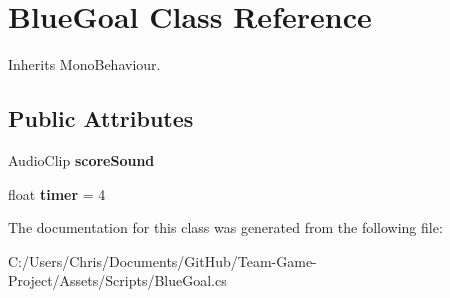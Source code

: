 \hypertarget{class_blue_goal}{}\section{Blue\+Goal Class Reference}
\label{class_blue_goal}


Inherits Mono\+Behaviour.

\subsection*{Public Attributes}
\begin{DoxyCompactItemize}
\item 
Audio\+Clip {\bfseries score\+Sound}\hypertarget{class_blue_goal_ae9e9ef106ee6cd39c0b5c48ea93bdec2}{}\label{class_blue_goal_ae9e9ef106ee6cd39c0b5c48ea93bdec2}

\item 
float {\bfseries timer} = 4\hypertarget{class_blue_goal_aad7c2e72737e98222dc72667c269a3ea}{}\label{class_blue_goal_aad7c2e72737e98222dc72667c269a3ea}

\end{DoxyCompactItemize}


The documentation for this class was generated from the following file\+:\begin{DoxyCompactItemize}
\item 
C\+:/\+Users/\+Chris/\+Documents/\+Git\+Hub/\+Team-\/\+Game-\/\+Project/\+Assets/\+Scripts/Blue\+Goal.\+cs\end{DoxyCompactItemize}
